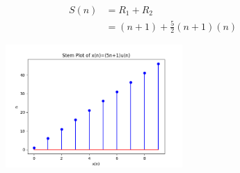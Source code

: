 \documentclass[journal,12pt,twocolumn]{IEEEtran}
\theoremstyle{remark}
\begin{document}
\begin{align}
 S(n) &= R_1 + R_2\\
    &= (n+1) + \frac{5}{2}(n+1)(n)
\end{align}
\begin{figure}[h]
  \centering
  \includegraphics[width=0.6\textwidth]{figs/newstem.png}
 
  \label{fig:Stem_Plot}
\end{figure}
\end{document}
